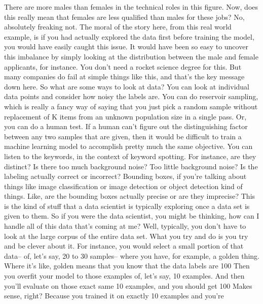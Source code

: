     There are more males than females in the technical roles in this figure.
    Now, does this really mean that females are less qualified than males
    for these jobs?
    No, absolutely freaking not.
    The moral of the story here, from this real world example,
    is if you had actually explored the data first before training the model,
    you would have easily caught this issue.
    It would have been so easy to uncover this imbalance by simply
    looking at the distribution between the male and female applicants,
    for instance.
    You don't need a rocket science degree for this.
    But many companies do fail at simple things like this,
    and that's the key message down here.
    So what are some ways to look at data?
    You can look at individual data points and consider how noisy the labels are.
    You can do reservoir sampling, which is really
    a fancy way of saying that you just pick a random sample without replacement
    of K items from an unknown population size in a single pass.
    Or, you can do a human test.
    If a human can't figure out the distinguishing factor between any two
    samples that are given, then it would be difficult to train
    a machine learning model to accomplish pretty much the same objective.
    You can listen to the keywords, in the context of keyword spotting.
    For instance, are they distinct?
    Is there too much background noise?
    Too little background noise?
    Is the labeling actually correct or incorrect?
    Bounding boxes, if you're talking about things like image classification
    or image detection or object detection kind of things.
    Like, are the bounding boxes actually precise or are they imprecise?
    This is the kind of stuff that a data scientist is typically exploring
    once a data set is given to them.
    So if you were the data scientist, you might be thinking,
    how can I handle all of this data that's coming at me?
    Well, typically, you don't have to look at the large corpus of the entire data
    set.
    What you try and do is you try and be clever about it.
    For instance, you would select a small portion of that data--
    of, let's say, 20 to 30 samples--
    where you have, for example, a golden thing.
    Where it's like, golden means that you know
    that the data labels are 100%
    Then you overfit your model to those examples of, let's say, 10 examples.
    And then you'll evaluate on those exact same 10 examples,
    and you should get 100%
    Makes sense, right?
    Because you trained it on exactly 10 examples and you're
